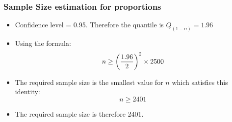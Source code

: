 \begin{frame}
\frametitle{Sample Size estimation for proportions}

\begin{itemize}
\item Confidence level = 0.95. Therefore the quantile is $Q_{(1-\alpha)} = 1.96$
\item Using the formula: \[ n \geq \left({1.96 \over 2 }\right)^2 \times 2500  \]
\item The required sample size is the smallest value for $n$ which satisfies this identity: \[ n \geq 2401  \]
\item The required sample size is therefore 2401.
\end{itemize}
\end{frame}
